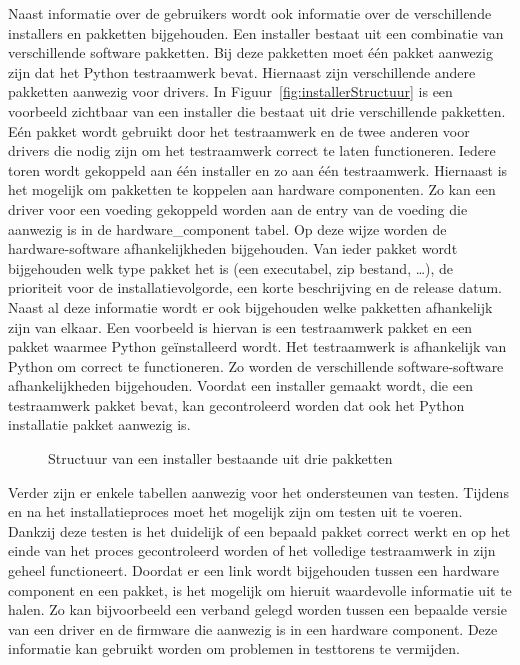 Naast informatie over de gebruikers wordt ook informatie over de verschillende installers en pakketten bijgehouden.
Een installer bestaat uit een combinatie van verschillende software pakketten.
Bij deze pakketten moet één pakket aanwezig zijn dat het Python testraamwerk bevat.
Hiernaast zijn verschillende andere pakketten aanwezig voor drivers.
In Figuur~\vref{fig:installerStructuur} is een voorbeeld zichtbaar van een installer die bestaat uit drie verschillende pakketten.
Eén pakket wordt gebruikt door het testraamwerk en de twee anderen voor drivers die nodig zijn om het testraamwerk correct te laten functioneren.
Iedere toren wordt gekoppeld aan één installer en zo aan één testraamwerk.
Hiernaast is het mogelijk om pakketten te koppelen aan hardware componenten.
Zo kan een driver voor een voeding gekoppeld worden aan de entry van de voeding die aanwezig is in de hardware\_component tabel.
Op deze wijze worden de hardware-software afhankelijkheden bijgehouden.
Van ieder pakket wordt bijgehouden welk type pakket het is (een executabel, zip bestand, \ldots), de prioriteit voor de installatievolgorde, een korte beschrijving en de release datum.
Naast al deze informatie wordt er ook bijgehouden welke pakketten afhankelijk zijn van elkaar.
Een voorbeeld is hiervan is een testraamwerk pakket en een pakket waarmee Python geïnstalleerd wordt.
Het testraamwerk is afhankelijk van Python om correct te functioneren.
Zo worden de verschillende software-software afhankelijkheden bijgehouden.
Voordat een installer gemaakt wordt, die een testraamwerk pakket bevat, kan gecontroleerd worden dat ook het Python installatie pakket aanwezig is.

\begin{figure}[!ht]
\centering
{}
\caption{Structuur van een installer bestaande uit drie pakketten}
\label{fig:installerStructuur}
\end{figure}

Verder zijn er enkele tabellen aanwezig voor het ondersteunen van testen.
Tijdens en na het installatieproces moet het mogelijk zijn om testen uit te voeren.
Dankzij deze testen is het duidelijk of een bepaald pakket correct werkt en op het einde van het proces gecontroleerd worden of het volledige testraamwerk in zijn geheel functioneert.
Doordat er een link wordt bijgehouden tussen een hardware component en een pakket, is het mogelijk om hieruit waardevolle informatie uit te halen.
Zo kan bijvoorbeeld een verband gelegd worden tussen een bepaalde versie van een driver en de firmware die aanwezig is in een hardware component.
Deze informatie kan gebruikt worden om problemen in testtorens te vermijden.

